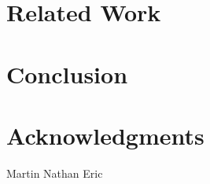 \documentclass{sig-alternate}
\begin{document}
\section{Related Work}


\section{Conclusion}


\section{Acknowledgments}
Martin
Nathan
Eric


%
%

\balancecolumns
\end{document}
